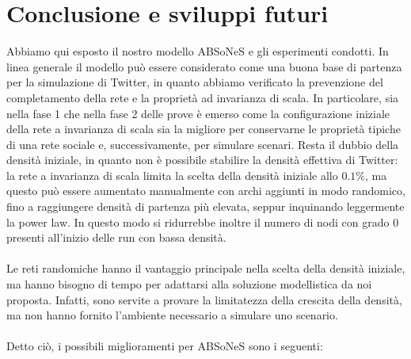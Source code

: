 \documentclass[a4paper,12pt]{article}
\begin{document}
\section{Conclusione e sviluppi futuri}
\label{sec:end}
Abbiamo qui esposto il nostro modello ABSoNeS e gli esperimenti condotti. In linea generale il modello può essere considerato come una buona base di partenza per la simulazione di Twitter, in quanto abbiamo verificato la prevenzione del completamento della rete e la proprietà ad invarianza di scala. In particolare, sia nella fase 1 che nella fase 2 delle prove è emerso come la configurazione iniziale della rete a invarianza di scala sia la migliore per conservarne le proprietà tipiche di una rete sociale e, successivamente, per simulare scenari. Resta il dubbio della densità iniziale, in quanto non è possibile stabilire la densità effettiva di Twitter: la rete a invarianza di scala limita la scelta della densità iniziale allo $0.1\%$, ma questo può essere aumentato manualmente con archi aggiunti in modo randomico, fino a raggiungere densità di partenza più elevata, seppur inquinando leggermente la power law. In questo modo si ridurrebbe inoltre il numero di nodi con grado $0$ presenti all'inizio delle run con bassa densità.  \\ \\
Le reti randomiche hanno il vantaggio principale nella scelta della densità iniziale, ma hanno bisogno di tempo per adattarsi alla soluzione modellistica da noi proposta. Infatti, sono servite a provare la limitatezza della crescita della densità, ma non hanno fornito l'ambiente necessario a simulare uno scenario.
\\ \\
Detto ciò, i possibili miglioramenti per ABSoNeS sono i seguenti:
\end{document}
